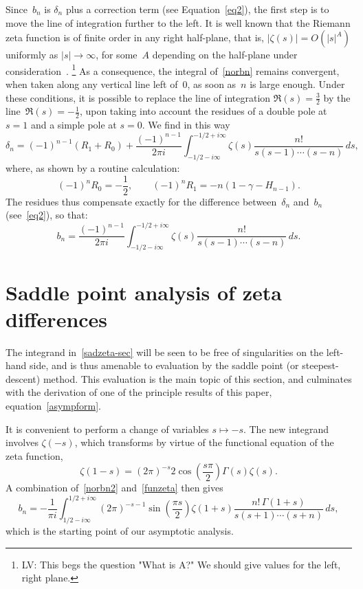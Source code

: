 \documentclass{amsart}
\begin{document}
Since~$b_n$ is $\delta_n$ plus a correction term (see Equation~\eqref{eq2}),
the first step is to move the line of integration further to the left.
It is well known that the Riemann zeta function is of finite order in any right half-plane,
that is, $|\zeta(s)|=O(|s|^A)$ uniformly as $|s|\to\infty$, for some~$A$ depending on the
half-plane under consideration~\cite{Titchmarsh86}.
\footnote{
LV: This begs the question "What is A?" We should give values for the left, right plane.
}
As a consequence, the integral of~\eqref{norbn} remains 
convergent, when taken along any vertical line left of~0,
as soon as~$n$ is large enough. Under these conditions, it is possible
to replace the line of integration $\Re(s)=\frac32$ by the line~$\Re(s)=-\frac12$, upon
taking into account the residues of a double pole at $s=1$ and a simple
pole at $s=0$.
We find in this way
\[
\delta_n=(-1)^{n-1} (R_1+R_0)+\frac{(-1)^{n-1}}{2\pi i}\int_{-1/2-i\infty}^{-1/2+i\infty} 
\zeta(s) \frac{n!}{s(s-1)\cdots(s-n)}\, ds, \]
where, as shown by a routine calculation:
\[
(-1)^n R_0=-\frac12,
\qquad
(-1)^nR_1=-n(1-\gamma-H_{n-1}).
\]
The residues thus compensate exactly 
for the difference between~$\delta_n$ and~$b_n$ (see~\eqref{eq2}), so that:
\begin{equation}\label{norbn2}
b_n=
\frac{(-1)^{n-1}}{2\pi i}\int_{-1/2-i\infty}^{-1/2+i\infty} 
\zeta(s) \frac{n!}{s(s-1)\cdots(s-n)}\, ds.
\end{equation}

\section{Saddle point analysis of zeta differences}\label{sadzeta-sec}

The integrand in~\eqref{sadzeta-sec} will be seen to be free of 
singularities on the left-hand side, and is thus amenable to evaluation
by the saddle point (or steepest-descent) method.  This evaluation 
is the main topic of this section, and culminates with the derivation of
one of the principle results of this paper, equation~\eqref{asympform}.

It is convenient to perform a change of variables $s\mapsto -s$.
The new integrand involves $\zeta(-s)$, which transforms by virtue of the 
functional equation 
of the zeta function,
\begin{equation}\label{funzeta}
\zeta(1-s)=(2\pi)^{-s}2\cos\left(\frac{s\pi}{2}\right)\Gamma(s)\zeta(s).
\end{equation}
A combination of~\eqref{norbn2} and~\eqref{funzeta} then gives
\begin{equation}\label{mainint}
b_n = -\frac{1}{\pi i} 
\int_{1/2-i\infty}^{1/2+i\infty} 
(2\pi)^{-s-1} \sin\left(\frac{\pi s}{2}\right)\zeta(1+s)
\frac{n!\,\Gamma(1+s)}{s(s+1)\cdots(s+n)}\, ds,
\end{equation}
which is the starting point of our asymptotic analysis.
\end{document}
